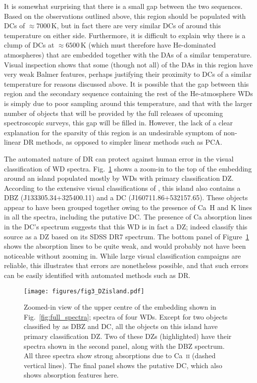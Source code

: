 \documentclass[fleqn,usenatbib]{mnras}
\begin{document}
It is somewhat surprising that there is a small gap between the two sequences.
Based on the observations outlined above, this region should be populated with DCs of $\approx7000\,\text{K}$, but in fact there are very similar DCs of around this temperature on either side.
Furthermore, it is difficult to explain why there is a clump of DCs at $\approx 6500\,\text{K}$ (which must therefore have He-dominated atmospheres) that are embedded together with the DAs of a similar temperature.
Visual inspection shows that some (though not all) of the DAs in this region have very weak Balmer features, perhaps justifying their proximity to DCs of a similar temperature for reasons discussed above.
It is possible that the gap between this region and the secondary sequence containing the rest of the He-atmosphere WDs is simply due to poor sampling around this temperature, and that with the larger number of objects that will be provided by the full releases of upcoming spectroscopic surveys, this gap will be filled in.
However, the lack of a clear explanation for the sparsity of this region is an undesirable symptom of non-linear DR methods, as opposed to simpler linear methods such as PCA.

The automated nature of DR can protect against human error in the visual classification of WD spectra.
Fig.~\ref{fig:DZisland} shows a zoom-in to the top of the embedding around an island populated mostly by WDs with primary classification DZ.
According to the extensive visual classifications of \citet{manser24}, this island also contains a DBZ (J133305.34+325400.11) and a DC (J160711.86+532157.65).
These objects appear to have been grouped together owing to the presence of Ca~H and K lines in all the spectra, including the putative DC.
The presence of Ca absorption lines in the DC's spectrum suggests that this WD is in fact a DZ; indeed \citet{kleinman13} classify this source as a DZ based on its SDSS DR7 spectrum.
The bottom panel of Figure~\ref{fig:DZisland} shows the absorption lines to be quite weak, and would probably not have been noticeable without zooming in.
While large visual classification campaigns are reliable, this illustrates that errors are nonetheless possible, and that such errors can be easily identified with automated methods such as DR.

\begin{figure}
\texttt{[image: figures/fig3\_DZisland.pdf]}
\caption{
    Zoomed-in view of the upper centre of the embedding shown in Fig.~\ref{fig:full_spectra}; spectra of four WDs.
    Except for two objects classified by \citet{manser24} as DBZ and DC, all the objects on this island have primary classification DZ.
    Two of these DZs (highlighted) have their spectra shown in the second panel, along with the DBZ spectrum.
    All three spectra show strong absorptions due to Ca~\textsc{ii} (dashed vertical lines).
    The final panel shows the putative DC, which also shows absorption features here.
}
\label{fig:DZisland}
\end{figure}
\end{document}
